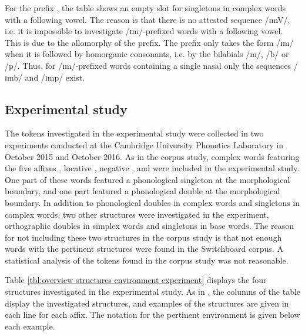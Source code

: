 For the prefix , the table shows an empty slot for singletons in complex words with a following vowel. The reason is that there is no attested sequence /ɪmV/, i.e. it is impossible to investigate /ɪm/-prefixed words with a following vowel. This is due to the allomorphy of the prefix. The prefix  only takes the form /ɪm/ when it is followed by homorganic consonants, i.e. by the bilabials /m/, /b/ or /p/. Thus, for /ɪm/-prefixed words containing a single nasal only the sequences /ɪmb/ and /ɪmp/ exist. 



\subsection{Experimental study}\label{experiment data composition}

The tokens investigated in the experimental study were collected in two experiments conducted at the Cambridge University Phonetics Laboratory in October 2015 and October 2016. 
 As in the corpus study, complex words featuring the five affixes , locative , negative ,  and  were included  in the experimental study. One part of these words featured a phonological singleton at the morphological boundary, and one part  featured a phonological double at the morphological boundary. In addition to phonological doubles in complex words and singletons in complex words, two other structures were investigated in the experiment, orthographic doubles in simplex words and singletons in base words. The reason for not including these two structures in the corpus study is that not enough words with the pertinent structures were found in the Switchboard corpus. A statistical analysis of the tokens found in the corpus study was not reasonable.
 
 Table \ref{tbl:overview structures environment experiment} displays the four structures investigated in the experimental study. As in , the columns of the table display the investigated structures, and examples of the structures are given in each line for each affix. The notation for the pertinent environment is given below each example. 
 
 

